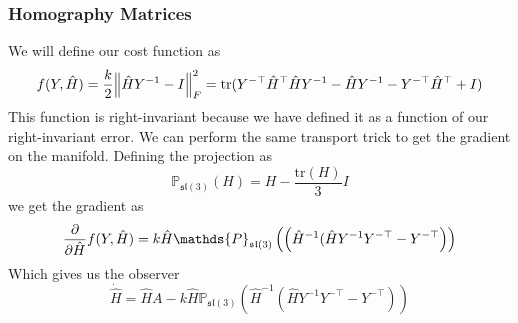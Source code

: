 \documentclass[a4paper]{article}
\begin{document}
\subsubsection*{Homography Matrices}%
We will define our cost function as 
\[
  f(Y,\hat{H}) = \frac{k}{2} \norm{\hat{H}Y^{-1} - I}_F^2 = \text{tr}(Y^{-\top}\hat{H}^\top\hat{H}Y^{-1} - \hat{H}Y^{-1} - Y^{-\top}\hat{H}^\top + I)
\]
This function is right-invariant because we have defined it as a function of our right-invariant error. We can perform the same transport trick to get the gradient on the manifold. Defining the projection as 
\[
  \mathds{P}_{\mathfrak{sl}(3)}(H) = H - \frac{\text{tr}(H)}{3}I
\]
we get the gradient as
\[
  \pdv{}{\hat{H}} f(Y,\hat{H}) = k\hat{H} \mathds{P}_{\mathfrak{sl}(3)}\left(\left( \hat{H}^{-1}(\hat{H}Y^{-1}Y^{-\top} - Y^{-\top} \right) \right)
\]
Which gives us the observer
\[
  \dot{\hat{H}} = \hat{H}A - k\hat{H} \mathds{P}_{\mathfrak{sl}(3)}\left(\hat{H}^{-1}\left(\hat{H}Y^{-1}Y^{-\top} - Y^{-\top} \right) \right)
\]
\end{document}
